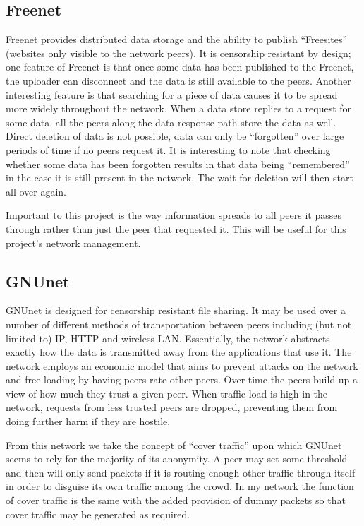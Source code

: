 \documentclass[ %
                    author={Luke Murray},
                supervisor={Dr. Simon Hollis},
                     title={Shadow Peer-to-Peer Networks},
                  subtitle={},
                    degree={MEng},
                      year={2013} ]{thesis}
\begin{document}
\subsection{Freenet}

Freenet\cite{Freenet} provides distributed data storage and the ability to publish ``Freesites'' (websites only visible to the network peers). It is censorship resistant by design; one feature of Freenet is that once some data has been published to the Freenet, the uploader can disconnect and the data is still available to the peers. Another interesting feature is that searching for a piece of data causes it to be spread more widely throughout the network. When a data store replies to a request for some data, all the peers along the data response path store the data as well. Direct deletion of data is not possible, data can only be ``forgotten'' over large periods of time if no peers request it. It is interesting to note that checking whether some data has been forgotten results in that data being ``remembered'' in the case it is still present in the network. The wait for deletion will then start all over again.

Important to this project is the way information spreads to all peers it passes through rather than just the peer that requested it. This will be useful for this project's network management.

\subsection{GNUnet}

GNUnet\cite{GNUnet} is designed for censorship resistant file sharing. It may be used over a number of different methods of transportation between peers including (but not limited to) IP, HTTP and wireless LAN. Essentially, the network abstracts exactly how the data is transmitted away from the applications that use it. The network employs an economic model that aims to prevent attacks on the network and free-loading by having peers rate other peers. Over time the peers build up a view of how much they trust a given peer. When traffic load is high in the network, requests from less trusted peers are dropped, preventing them from doing further harm if they are hostile.

From this network we take the concept of ``cover traffic'' upon which GNUnet seems to rely for the majority of its anonymity. A peer may set some threshold and then will only send packets if it is routing enough other traffic through itself in order to disguise its own traffic among the crowd. In my network the function of cover traffic is the same with the added provision of dummy packets so that cover traffic may be generated as required.
\end{document}
